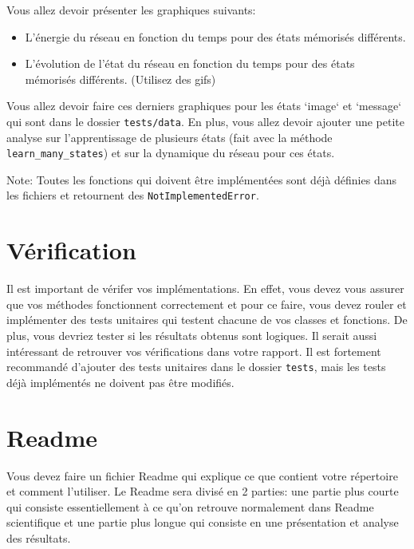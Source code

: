 \documentclass[12pt, letterpaper]{article}
\numberwithin{table}{section}
\numberwithin{figure}{section}
\numberwithin{equation}{section}
\begin{document}
\noindent Vous allez devoir présenter les graphiques suivants:
\begin{itemize}[label=\textbullet]
    \item L'énergie du réseau en fonction du temps pour des états mémorisés différents.
    \item L'évolution de l'état du réseau en fonction du temps pour des états mémorisés différents.
    (Utilisez des gifs)
\end{itemize}

\noindent Vous allez devoir faire ces derniers graphiques pour les états `image` et `message` qui sont dans le
dossier \texttt{tests/data}.
En plus, vous allez devoir ajouter une petite analyse sur l'apprentissage de plusieurs états
(fait avec la méthode \texttt{learn\_many\_states}) et sur la dynamique du réseau pour ces états.


\bigskip

\noindent Note: Toutes les fonctions qui doivent être implémentées sont déjà définies dans les fichiers
et retournent des \texttt{NotImplementedError}.


\section{Vérification}\label{sec:verification}

\noindent Il est important de vérifer vos implémentations.
En effet, vous devez vous assurer que vos méthodes fonctionnent correctement et pour ce faire, vous devez rouler et
implémenter des tests unitaires qui testent chacune de vos classes et fonctions.
De plus, vous devriez tester si les résultats obtenus sont logiques.
Il serait aussi intéressant de retrouver vos vérifications dans votre rapport.
Il est fortement recommandé d'ajouter des tests unitaires dans le dossier \texttt{tests}, mais les tests déjà
implémentés ne doivent pas être modifiés.


\section{Readme}\label{sec:Readme}

\noindent Vous devez faire un fichier Readme qui explique ce que contient votre répertoire et comment l'utiliser.
Le Readme sera divisé en 2 parties: une partie plus courte qui consiste essentiellement à ce qu'on retrouve normalement
dans Readme scientifique et une partie plus longue qui consiste en une présentation et analyse des résultats.
\end{document}
